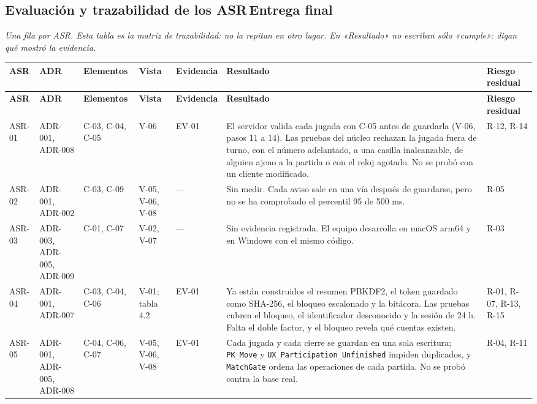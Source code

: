 \documentclass[11pt,letterpaper]{article}
\newcommand{\hint}[1]{{\itshape\color{black!70}#1}\par} %
\newcommand{\greenbadge}[1]{\hspace{0.4em}\colorbox{SADGreenBg}{\scriptsize\bfseries\color{SADGreen}\,#1\,}}
\newcommand{\hd}[1]{\textbf{\small #1}}
\newcommand{\headrow}{\rowcolor{SADHead}}
\begin{document}
\subsection{Evaluación y trazabilidad de los ASR\greenbadge{Entrega final}}
\hint{Una fila por ASR. Esta tabla es la matriz de trazabilidad: no la repitan en otro lugar. En «Resultado» no escriban sólo «cumple»: digan qué mostró la evidencia.}
\begin{xltabular}{\linewidth}{|>{\small\raggedright\arraybackslash}p{1.4cm}|>{\small\raggedright\arraybackslash}p{1.6cm}|>{\small\raggedright\arraybackslash}p{1.7cm}|>{\small\raggedright\arraybackslash}p{1.3cm}|>{\small\raggedright\arraybackslash}p{1.7cm}|Y|>{\small\raggedright\arraybackslash}p{1.6cm}|}\hline
  \headrow\hd{ASR} & \hd{ADR} & \hd{Elementos} & \hd{Vista} & \hd{Evidencia} & \hd{Resultado} & \hd{Riesgo residual}\\\hline
  \endfirsthead
  \headrow\hd{ASR} & \hd{ADR} & \hd{Elementos} & \hd{Vista} & \hd{Evidencia} & \hd{Resultado} & \hd{Riesgo residual}\\\hline
  \endhead
  ASR-01 & ADR-001, ADR-008 & C-03, C-04, C-05 & V-06 & EV-01 & El servidor valida cada jugada con C-05 antes de guardarla (V-06, pasos 11 a 14). Las pruebas del núcleo rechazan la jugada fuera de turno, con el número adelantado, a una casilla inalcanzable, de alguien ajeno a la partida o con el reloj agotado. No se probó con un cliente modificado. & R-12, R-14\\\hline
  ASR-02 & ADR-001, ADR-002 & C-03, C-09 & V-05, V-06, V-08 & — & Sin medir. Cada aviso sale en una vía después de guardarse, pero no se ha comprobado el percentil 95 de 500 ms. & R-05\\\hline
  ASR-03 & ADR-003, ADR-005, ADR-009 & C-01, C-07 & V-02, V-07 & — & Sin evidencia registrada. El equipo desarrolla en macOS arm64 y en Windows con el mismo código. & R-03\\\hline
  ASR-04 & ADR-001, ADR-007 & C-03, C-04, C-06 & V-01; tabla 4.2 & EV-01 & Ya están construidos el resumen PBKDF2, el token guardado como SHA-256, el bloqueo escalonado y la bitácora. Las pruebas cubren el bloqueo, el identificador desconocido y la sesión de 24 h. Falta el doble factor, y el bloqueo revela qué cuentas existen. & R-01, R-07, R-13, R-15\\\hline
  ASR-05 & ADR-001, ADR-005, ADR-008 & C-04, C-06, C-07 & V-05, V-06, V-08 & EV-01 & Cada jugada y cada cierre se guardan en una sola escritura; \texttt{PK\_Move} y \texttt{UX\_Participation\_\allowbreak Unfinished} impiden duplicados, y \texttt{MatchGate} ordena las operaciones de cada partida. No se probó contra la base real. & R-04, R-11\\\hline

\end{xltabular}
\end{document}

